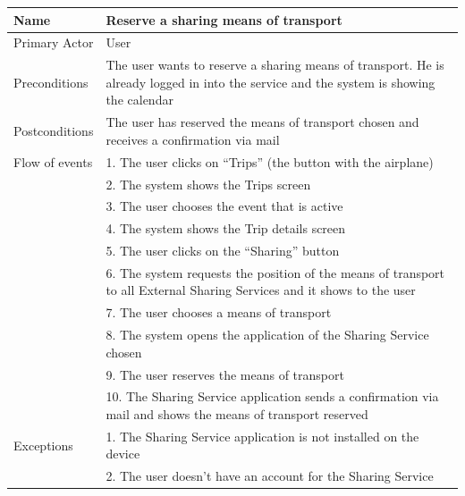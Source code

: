 \begin{center}
\def\arraystretch{1.25}
  \begin{tabular}{ | l | p{} | }
    \hline
    Name & Reserve a sharing means of transport \\ \hline
    Primary Actor & User \\ \hline
    Preconditions & The user wants to reserve a sharing means of transport. He is already logged in into the service and the system is showing the calendar \\ \hline
    Postconditions & The user has reserved the means of transport chosen and receives a confirmation via mail \\ \hline
    Flow of events  & 1.	The user clicks on “Trips” (the button with the airplane) \\
					& 2.	The system shows the Trips screen \\
					& 3.	The user chooses the event that is active \\
					& 4.	The system shows the Trip details screen \\
					& 5.	The user clicks on the “Sharing” button \\
					& 6.	The system requests the position of the means of transport to all External Sharing Services and it shows to the user \\
					& 7.	The user chooses a means of transport \\
					& 8.	The system opens the application of the Sharing Service chosen \\
					& 9.	The user reserves the means of transport \\
					& 10.	The Sharing Service application sends a confirmation via mail and shows the means of transport reserved \\
 \hline
    Exceptions  & 1.	The Sharing Service application is not installed on the device \\
				& 2.	The user doesn’t have an account for the Sharing Service

 \\
 \hline
  \end{tabular}
\end{center}

